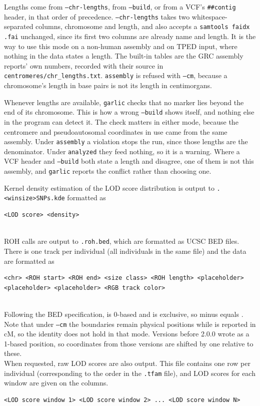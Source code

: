 \documentclass[12pt]{article}%
\begin{document}
Lengths come from {\tt --chr-lengths}, from {\tt --build}, or from a VCF's
{\tt \#\#contig} header, in that order of precedence.  {\tt --chr-lengths} takes
two whitespace-separated columns, chromosome and length, and also accepts a
{\tt samtools faidx} {\tt .fai} unchanged, since its first two columns are
already name and length.  It is the way to use this mode on a non-human
assembly and on TPED input, where nothing in the data states a length.  The
built-in tables are the GRC assembly reports' own numbers, recorded with their
source in {\tt centromeres/chr\_lengths.txt}.  {\tt assembly} is refused with
{\tt --cm}, because a chromosome's length in base pairs is not its length in
centimorgans.

Whenever lengths are available, {\tt garlic} checks that no marker lies beyond
the end of its chromosome.  This is how a wrong {\tt --build} shows itself, and
nothing else in the program can detect it.  The check matters in either mode,
because the centromere and pseudoautosomal coordinates in use came from the
same assembly.  Under {\tt assembly} a violation stops the run, since those
lengths are the denominator.  Under {\tt analyzed} they feed nothing, so it is
a warning.  Where a VCF header and {\tt --build} both state a length and
disagree, one of them is not this assembly, and {\tt garlic} reports the
conflict rather than choosing one.

Kernel density estimation of the LOD score distribution is output to {\tt .<winsize>SNPs.kde} formatted as
\begin{lstlisting}
<LOD score> <density>
\end{lstlisting}
~\\
ROH calls are output to {\tt .roh.bed}, which are formatted as UCSC BED files. There is one track per individual (all individuals in the same file) and the data are formatted as
\begin{lstlisting}
<chr> <ROH start> <ROH end> <size class> <ROH length> <placeholder> <placeholder> <placeholder> <RGB track color>
\end{lstlisting}
~\\
\noindent Following the BED specification, {\tt <ROH start>} is 0-based and
{\tt <ROH end>} is exclusive, so {\tt <ROH end>} minus {\tt <ROH start>}
equals {\tt <ROH length>}.  Note that under {\tt --cm} the boundaries remain
physical positions while {\tt <ROH length>} is reported in cM, so the identity
does not hold in that mode.  Versions before 2.0.0 wrote {\tt <ROH start>} as
a 1-based position, so coordinates from those versions are shifted by one
relative to these.
~\\
When requested, raw LOD scores are also output.  This file contains one row per individual (corresponding to the order in the {\tt .tfam} file), and LOD scores for each window are given on the columns.
\begin{lstlisting}
<LOD score window 1> <LOD score window 2> ... <LOD score window N>
\end{lstlisting}
~\\
\end{document}
